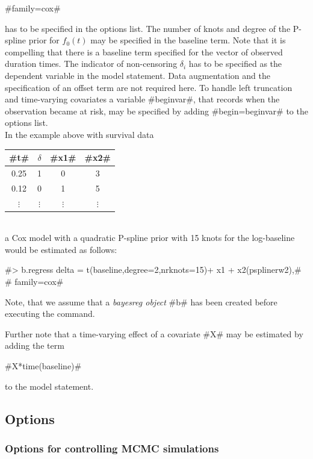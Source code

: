 #family=cox#

has to be specified in the options list. The number of knots and
degree of the P-spline prior for $f_0(t)$ may be specified in the
baseline term. Note that it is compelling that there is a baseline
term specified for the vector of observed duration times. The
indicator of non-censoring $\delta_i$ has to be specified as the
dependent variable in the model statement. Data augmentation and the
specification of an offset term are not required here. To handle
left truncation and time-varying covariates a variable #beginvar#,
that records when the observation became at risk, may be specified
by adding #begin=beginvar# to
the options list.\\
In the example above with survival data

\vspace{0.5cm}

\begin{tabular}{c|c|c|c}
  #t# &   $\delta$ &  #x1# &  #x2#\\\hline\hline
0.25  &  1  &    0  &  3\\\hline 0.12  &  0  &    1  &  5\\\hline
$\vdots$ & $\vdots$ & $\vdots$ & $\vdots$ \\
\end{tabular}
\vspace{0.5cm}\\
a Cox model with a quadratic P-spline prior with 15 knots for the
log-baseline would be estimated as follows:

 #> b.regress delta = t(baseline,degree=2,nrknots=15)+ x1 + x2(psplinerw2),#\\
 #  family=cox#

Note, that we assume that a {\em bayesreg object} #b# has been
created before executing the command.

Further note that a time-varying effect of a covariate #X# may be
estimated by adding the term

#X*time(baseline)#

to the model statement.

\subsection{Options}
\label{regressoptions}

\vspace{0.4cm}

\subsubsection*{Options for controlling MCMC simulations}
\label{mcmc_options}

